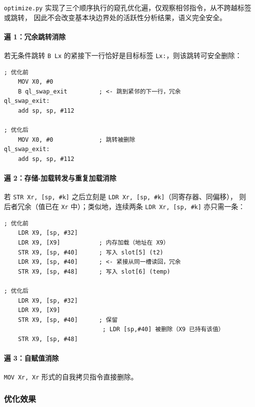 \documentclass[12pt,a4paper]{ctexart}
\begin{document}
\texttt{optimize.py} 实现了三个顺序执行的窥孔优化遍，仅观察相邻指令，从不跨越标签或跳转，
因此不会改变基本块边界处的活跃性分析结果，语义完全安全。

\paragraph{遍 1：冗余跳转消除}

若无条件跳转 \texttt{B Lx} 的紧接下一行恰好是目标标签 \texttt{Lx:}，则该跳转可安全删除：

\begin{lstlisting}[language=ARM, caption={冗余跳转消除示例}]
; 优化前
    MOV X0, #0
    B ql_swap_exit         ; <- 跳到紧邻的下一行，冗余
ql_swap_exit:
    add sp, sp, #112

; 优化后
    MOV X0, #0             ; 跳转被删除
ql_swap_exit:
    add sp, sp, #112
\end{lstlisting}

\paragraph{遍 2：存储-加载转发与重复加载消除}

若 \texttt{STR Xr, [sp, \#k]} 之后立刻是 \texttt{LDR Xr, [sp, \#k]}（同寄存器、同偏移），
则后者冗余（值已在 \texttt{Xr} 中）；类似地，连续两条 \texttt{LDR Xr, [sp, \#k]} 亦只需一条：

\begin{lstlisting}[language=ARM, caption={存储-加载转发示例（swap 函数开头）}]
; 优化前
    LDR X9, [sp, #32]
    LDR X9, [X9]           ; 内存加载（地址在 X9）
    STR X9, [sp, #40]      ; 写入 slot[5] (t2)
    LDR X9, [sp, #40]      ; <- 紧接从同一槽读回，冗余
    STR X9, [sp, #48]      ; 写入 slot[6] (temp)

; 优化后
    LDR X9, [sp, #32]
    LDR X9, [X9]
    STR X9, [sp, #40]      ; 保留
                            ; LDR [sp,#40] 被删除（X9 已持有该值）
    STR X9, [sp, #48]
\end{lstlisting}

\paragraph{遍 3：自赋值消除}

\texttt{MOV Xr, Xr} 形式的自我拷贝指令直接删除。

\subsubsection{优化效果}
\end{document}
